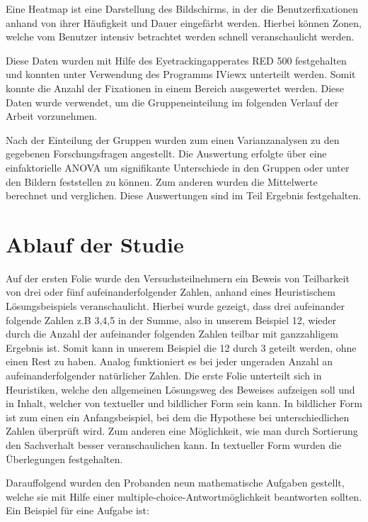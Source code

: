 Eine Heatmap ist eine Darstellung des Bildschirms, in der die Benutzerfixationen anhand von ihrer Häufigkeit und Dauer eingefärbt werden. Hierbei können Zonen, welche vom Benutzer intensiv betrachtet werden schnell veranschaulicht werden.

Diese Daten wurden mit Hilfe des Eyetrackingapperates RED 500 festgehalten und konnten unter Verwendung des Programms IViewx unterteilt werden. Somit konnte die Anzahl der Fixationen in einem Bereich ausgewertet werden. Diese Daten wurde verwendet, um die Gruppeneinteilung im folgenden Verlauf der Arbeit vorzunehmen.

Nach der Einteilung der Gruppen wurden zum einen Varianzanalysen zu den gegebenen Forschungsfragen angestellt. Die Auswertung erfolgte über eine einfaktorielle ANOVA um signifikante Unterschiede in den Gruppen oder unter den Bildern feststellen zu können. Zum anderen wurden die Mittelwerte berechnet und verglichen. Diese Auswertungen sind im Teil Ergebnis festgehalten.

\section{Ablauf der Studie}

Auf der ersten Folie wurde den Versuchsteilnehmern ein Beweis von Teilbarkeit  von drei oder fünf aufeinanderfolgender Zahlen, anhand eines Heuristischem Lösungsbeispiels veranschaulicht. Hierbei wurde gezeigt, dass drei aufeinander folgende Zahlen z.B 3,4,5 in der Summe, also in unserem Beispiel 12, wieder durch die Anzahl der aufeinander folgenden Zahlen teilbar mit ganzzahligem Ergebnis ist. Somit kann in unserem Beispiel die 12 durch 3 geteilt werden, ohne einen Rest zu haben.
Analog funktioniert es bei jeder ungeraden Anzahl an aufeinanderfolgender natürlicher Zahlen. Die erste Folie unterteilt sich in Heuristiken, welche den allgemeinen Lösungsweg des Beweises aufzeigen soll und in Inhalt, welcher von textueller und bildlicher Form sein kann. In bildlicher Form ist zum einen ein Anfangsbeispiel, bei dem die Hypothese bei unterschiedlichen Zahlen überprüft wird. Zum anderen eine Möglichkeit, wie man durch Sortierung den Sachverhalt besser veranschaulichen kann. In textueller Form wurden die Überlegungen festgehalten.

Darauffolgend wurden den Probanden neun mathematische Aufgaben gestellt, welche sie mit Hilfe einer multiple-choice-Antwortmöglichkeit beantworten sollten. Ein Beispiel für eine Aufgabe ist:

